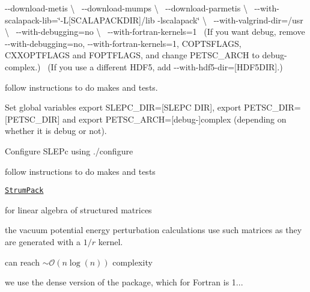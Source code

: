 \begin{DoxyItemize}
\begin{DoxyItemize}
\begin{DoxyEnumerate}
 {\ttfamily -\/-\/download-\/metis \textbackslash{}}~\newline
 {\ttfamily -\/-\/download-\/mumps \textbackslash{}}~\newline
 {\ttfamily -\/-\/download-\/parmetis \textbackslash{}}~\newline
 {\ttfamily -\/-\/with-\/scalapack-\/lib=\char`\"{}-\/\+L\mbox{[}\+S\+C\+A\+L\+A\+P\+A\+C\+K\+D\+I\+R\mbox{]}/lib -\/lscalapack\char`\"{} \textbackslash{}}~\newline
 {\ttfamily -\/-\/with-\/valgrind-\/dir=/usr \textbackslash{}}~\newline
 {\ttfamily -\/-\/with-\/debugging=no \textbackslash{}}~\newline
 {\ttfamily -\/-\/with-\/fortran-\/kernels=1}~\newline
 (If you want debug, remove {\ttfamily -\/-\/with-\/debugging=no}, {\ttfamily -\/-\/with-\/fortran-\/kernels=1}, C\+O\+P\+T\+S\+F\+L\+A\+GS, C\+X\+X\+O\+P\+T\+F\+L\+A\+GS and F\+O\+P\+T\+F\+L\+A\+GS, and change P\+E\+T\+S\+C\+\_\+\+A\+R\+CH to {\ttfamily debug-\/complex}.)~\newline
 (If you use a different H\+D\+F5, add {\ttfamily -\/-\/with-\/hdf5-\/dir=\mbox{[}H\+D\+F5\+D\+IR\mbox{]}}.)
\item follow instructions to do makes and tests.
\item Set global variables {\ttfamily export S\+L\+E\+P\+C\+\_\+\+D\+IR=\mbox{[}S\+L\+E\+PC D\+IR\mbox{]}}, {\ttfamily export P\+E\+T\+S\+C\+\_\+\+D\+IR=\mbox{[}P\+E\+T\+S\+C\+\_\+\+D\+IR\mbox{]}} and {\ttfamily export P\+E\+T\+S\+C\+\_\+\+A\+R\+CH=\mbox{[}debug-\/\mbox{]}complex} (depending on whether it is debug or not).
\item Configure S\+L\+E\+Pc using {\ttfamily ./configure}
\item follow instructions to do makes and tests
\end{DoxyEnumerate}
\end{DoxyItemize}
\item \href{http://portal.nersc.gov/project/sparse/strumpack/}{\tt Strum\+Pack}
\begin{DoxyItemize}
\item for linear algebra of structured matrices \cite{Ambikasaran2013}
\item the vacuum potential energy perturbation calculations use such matrices as they are generated with a $1/r$ kernel.
\item can reach $\sim \mathcal{O} (n \log(n))$ complexity
\item we use the dense version of the package, which for Fortran is 1...

\end{DoxyItemize}
\end{DoxyItemize}
